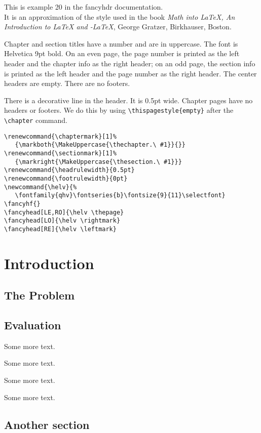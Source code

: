 \documentclass[openany]{book}
\renewcommand{\chaptermark}[1]%
   {\markboth{\MakeUppercase{\thechapter.\ #1}}{}}
\renewcommand{\sectionmark}[1]%
   {\markright{\MakeUppercase{\thesection.\ #1}}}
\renewcommand{\headrulewidth}{0.5pt}
\renewcommand{\footrulewidth}{0pt}
\newcommand{\helv}{%
   \fontfamily{qhv}\fontseries{b}\fontsize{9}{11}\selectfont}
\def\ams/{\protect\pAmS}
\def\pAmS{{\the\textfont2
        A\kern-.1667em\lower.5ex\hbox{M}\kern-.125emS}}
\def\amslatex/{\ams/-\LaTeX}
\begin{document}
\tableofcontents

\bigskip

\begin{boxedminipage}{\textwidth}
This is example 20 in the fancyhdr documentation.\\
It is an approximation of the style used in the book 
\textit{Math into LaTeX, An Introduction to \LaTeX{} and \amslatex/}, George Gratzer, Birkhauser, Boston.

Chapter and section titles have a number and are in uppercase. The font is Helvetica 9pt bold.
On an even page, the page number is printed as the left header and
the chapter info as the right header; on an odd page, the section info
is printed as the left header and the page number as the right header.  The
center headers are empty.  There are no footers.

There is a decorative line in the header.  It is 0.5pt wide.
Chapter pages have no headers or footers. We do this by using \verb|\thispagestyle{empty}| after the \verb|\chapter| command.

\begin{verbatim}
\renewcommand{\chaptermark}[1]%
   {\markboth{\MakeUppercase{\thechapter.\ #1}}{}}
\renewcommand{\sectionmark}[1]%
   {\markright{\MakeUppercase{\thesection.\ #1}}}
\renewcommand{\headrulewidth}{0.5pt}
\renewcommand{\footrulewidth}{0pt}
\newcommand{\helv}{%
   \fontfamily{qhv}\fontseries{b}\fontsize{9}{11}\selectfont}
\fancyhf{}
\fancyhead[LE,RO]{\helv \thepage}
\fancyhead[LO]{\helv \rightmark}
\fancyhead[RE]{\helv \leftmark}
\end{verbatim}
\end{boxedminipage}

\chapter{Introduction}
\thispagestyle{empty}

\lipsum

\section{The Problem}
\label{sec:problem}

\lipsum[3]

\section{Evaluation}

\lipsum

Some more text.

Some more text.

Some more text.

Some more text.


\section{Another section}

\lipsum[3]
\end{document}
